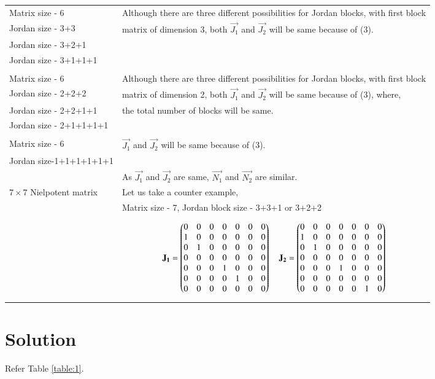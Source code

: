 \documentclass[journal,12pt,twocolumn]{IEEEtran}
\begin{document}
\begin{table*}[ht!]
\begin{center}
\begin{tabular}{|l|l|}
Matrix size - 6 & Although there are three different possibilities for Jordan blocks, with first block \\Jordan size - 3+3 &matrix of dimension 3, both $\vec{J_1}$ and $\vec{J_2}$ will be same because of (3).\\Jordan size - 3+2+1 &\\Jordan size - 3+1+1+1 &\\
&\\
Matrix size - 6 & Although there are three different possibilities for Jordan blocks, with first block \\Jordan size - 2+2+2 &matrix of dimension 2, both $\vec{J_1}$ and $\vec{J_2}$ will be same because of (3), where,\\Jordan size - 2+2+1+1 &the total number of blocks will be same.\\Jordan size - 2+1+1+1+1 &\\
&\\
Matrix size - 6 & $\vec{J_1}$ and $\vec{J_2}$ will be same because of (3). \\Jordan size-1+1+1+1+1+1 &\\
& As $\vec{J_1}$ and $\vec{J_2}$ are same, $\vec{N_1}$ and $\vec{N_2}$ are similar.
\\ [0.5ex]
\hline
$7 \times 7$ Nielpotent matrix & 
Let us take a counter example,\\
& Matrix size - 7, Jordan block size - 3+3+1 or 3+2+2\\
& \parbox{10cm}{\begin{align}
    \mathbf{J_1} = \begin{pmatrix}0&0&0&0&0&0&0\\1&0&0&0&0&0&0\\0&1&0&0&0&0&0\\0&0&0&0&0&0&0\\0&0&0&1&0&0&0\\0&0&0&0&1&0&0\\0&0&0&0&0&0&0\end{pmatrix} \quad 
    \mathbf{J_2} = \begin{pmatrix}0&0&0&0&0&0&0\\1&0&0&0&0&0&0\\0&1&0&0&0&0&0\\0&0&0&0&0&0&0\\0&0&0&1&0&0&0\\0&0&0&0&0&0&0\\0&0&0&0&0&1&0\end{pmatrix} 
\end{align}}\\
& From above, $\vec{J_1}$ and $\vec{J_2}$ are not same.
\\ [0.5ex]
\hline
\end{tabular}
\caption{Explanation}
\label{table:1}
\end{center}
\vspace{-0.5cm}
\end{table*}

\section{Solution}
Refer Table \ref{table:1}.
\end{document}
